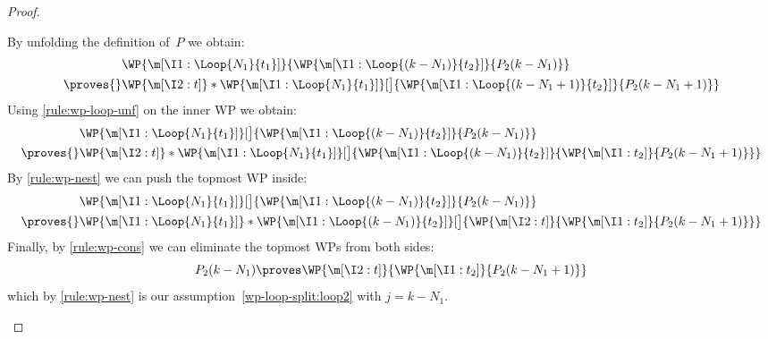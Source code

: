 \begin{proof}
\begin{casesplit}
  \case[$k>N_1$] By unfolding the definition of~$P$ we obtain:
    \begin{align*}
      &\WP {\m[\I1: \Loop{N_1}{t_1}]}{
        \WP {\m[\I1: \Loop{(k-N_1)}{t_2}]} { P_2(k-N_1) }
      }
      \\ {}\proves{}&
      \WP {\m[\I2: t]}*{
        \WP {\m[\I1: \Loop{N_1}{t_1}]}[\big]{
          \WP {\m[\I1: \Loop{(k-N_1+1)}{t_2}]} { P_2(k-N_1+1) }
        }
      }
    \end{align*}
    Using \ref{rule:wp-loop-unf} on the inner WP we obtain:
    \begin{align*}
      &\WP {\m[\I1: \Loop{N_1}{t_1}]}[\big]{
        \WP {\m[\I1: \Loop{(k-N_1)}{t_2}]} { P_2(k-N_1) }
      }
      \\ {}\proves{}&
      \WP {\m[\I2: t]}*{
        \WP {\m[\I1: \Loop{N_1}{t_1}]}[\big]{
          \WP {\m[\I1: \Loop{(k-N_1)}{t_2}]} {
            \WP{\m[\I1: t_2]}{P_2(k-N_1+1)}
          }
        }
      }
    \end{align*}
    By \ref{rule:wp-nest} we can push the topmost WP inside:
    \begin{align*}
      &\WP {\m[\I1: \Loop{N_1}{t_1}]}[\big]{
        \WP {\m[\I1: \Loop{(k-N_1)}{t_2}]} { P_2(k-N_1) }
      }
      \\ {}\proves{}&
      \WP {\m[\I1: \Loop{N_1}{t_1}]}*{
        \WP {\m[\I1: \Loop{(k-N_1)}{t_2}]}[\big]{
          \WP {\m[\I2: t]} {
            \WP{\m[\I1: t_2]}{P_2(k-N_1+1)}
          }
        }
      }
    \end{align*}
    Finally, by \ref{rule:wp-cons} we can eliminate the topmost WPs from both sides:
    \begin{equation*}
    P_2(k-N_1)
    \proves
    \WP {\m[\I2: t]} {
      \WP{\m[\I1: t_2]}{P_2(k-N_1+1)}
    }
    \end{equation*}
    which by \ref{rule:wp-nest} is our assumption~\eqref{wp-loop-split:loop2}
    with $j=k-N_1$.
  \qedhere
  \end{casesplit}
\end{proof}
